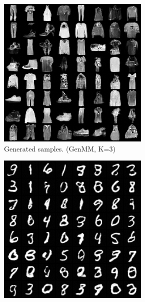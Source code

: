 \begin{figure}[!ht]
\begin{subfigure}[b]{0.24\textwidth}
    \includegraphics[width=1\linewidth]{images/fashion-mnist/samples/gene_c3_std1_samples.png}
    \caption{Generated samples. (GenMM, K=3)}
  \end{subfigure}
  \begin{subfigure}[b]{0.24\textwidth}
    \centering
    \includegraphics[width=1\linewidth]{images/mnist/samples/gen_LatMM_K3_std088.png}

\end{subfigure}
\end{figure}
